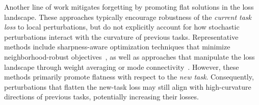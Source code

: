 \documentclass{article}
\begin{document}



Another line of work mitigates forgetting by promoting flat solutions in the loss landscape. These approaches typically encourage robustness of the \emph{current task loss} to local perturbations, but do not explicitly account for how stochastic perturbations interact with the curvature of previous tasks. 
Representative methods include sharpness-aware optimization techniques that minimize neighborhood-robust objectives~\cite{pmlr-v151-bisla22a,Zhang_GAM,NEURIPS2024_C-Flat,yangRevisitingFlatnessAwareOptimization2025,chen2026sharpnessflatnessdecompositionframework}, as well as approaches that manipulate the loss landscape through weight averaging or mode connectivity~\cite{izmailov2019averagingweightsleadswider,mirzadeh2020linearmodeconnectivitymultitask}. However, these methods primarily promote flatness with respect to the \emph{new task}. Consequently, perturbations that flatten the new-task loss may still align with high-curvature directions of previous tasks, potentially increasing their losses.
\end{document}
